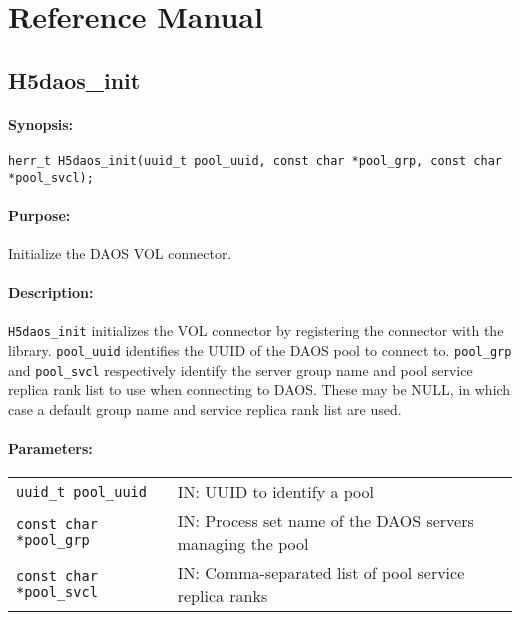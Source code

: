 \documentclass[../users_guide.tex]{subfiles}
\begin{document}
\section{Reference Manual}
\label{apdx:ref_manual}

\subsection{H5daos\_init}
\label{ref:h5daos_init}

\paragraph{Synopsis:}
\begin{flushleft}%
\begin{verbatim}
herr_t H5daos_init(uuid_t pool_uuid, const char *pool_grp, const char *pool_svcl);
\end{verbatim}
\end{flushleft}%

\paragraph{Purpose:}
\begin{flushleft}%
Initialize the DAOS VOL connector.
\end{flushleft}%

\paragraph{Description:}
\begin{flushleft}%
\texttt{H5daos\_init} initializes the VOL connector by registering the connector with
the library. \texttt{pool\_uuid} identifies the UUID of the DAOS pool to connect to.
\texttt{pool\_grp} and \texttt{pool\_svcl} respectively identify the server group name
and pool service replica rank list to use when connecting to DAOS. These may be NULL,
in which case a default group name and service replica rank list are used.
\end{flushleft}%

\paragraph{Parameters:}
\begin{flushleft}%
 \begin{tabular}{ll}%
   \texttt{uuid\_t pool\_uuid} & IN: UUID to identify a pool \\
   \texttt{const char *pool\_grp} & IN: Process set name of the DAOS servers managing the pool \\
   \texttt{const char *pool\_svcl} & IN: Comma-separated list of pool service replica ranks \\
 \end{tabular}%
\end{flushleft}%
\end{document}
